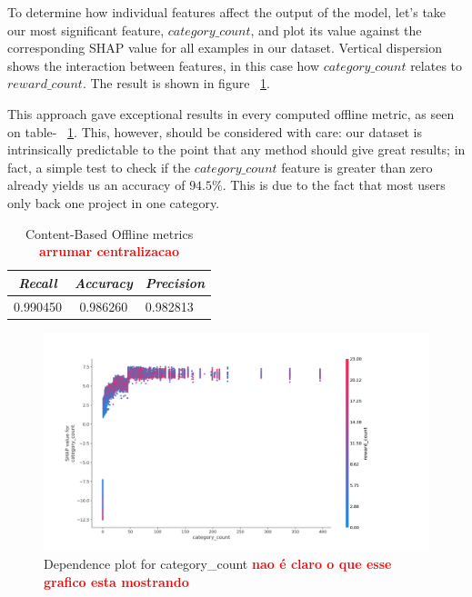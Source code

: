 \documentclass[cic,tc,english]{iiufrgs}
\newcommand{\bruno}[1]{\textcolor{red}{\textbf{#1}}}
\begin{document}
To determine how individual features affect the output of the model, let's take our most significant feature, $category\_count$, and plot its value against the corresponding SHAP value for all examples in our dataset. Vertical dispersion shows the interaction between features, in this case how $category\_count$ relates to $reward\_count$. The result is shown in figure ~\ref{fig:category_count}.

This approach gave exceptional results in every computed offline metric, as seen on table- ~\ref{tbl:cb_offline_metrics}. This, however, should be considered with care: our dataset is intrinsically predictable to the point that any method should give great results; in fact, a simple test to check if the $category\_count$ feature is greater than zero already yields us an accuracy of $94.5\%$. This is due to the fact that most users only back one project in one category.

\begin{table}[ht!]
    \caption{Content-Based Offline metrics \bruno{arrumar centralizacao}}
    \centering
        \begin{tabular}{c|c|p{5cm}}
          \hline
          \textit{Recall}  &   \textit{Accuracy}  &   \textit{Precision} \\
          \hline
          \hline
          0.990450           & 0.986260 &  0.982813 \\
          \hline
        \end{tabular}
    \label{tbl:cb_offline_metrics}
\end{table}

\begin{figure}[ht!]
    \caption{Dependence plot for category\_count \bruno{nao é claro o que esse grafico esta mostrando}}
    \begin{center}
        \includegraphics[width=\textwidth]{category_count}
    \end{center}
    \label{fig:category_count}
\end{figure}
\end{document}
